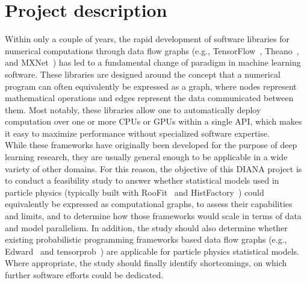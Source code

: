 \section{Project description}

Within only a couple of years, the rapid development of software libraries for numerical computations through data flow graphs (e.g., TensorFlow~\cite{tensorflow2015-whitepaper}, Theano~\cite{theano-full}, and MXNet~\cite{DBLP:journals/corr/ChenLLLWWXXZZ15}) has led to a fundamental change of paradigm in machine learning software.
These libraries are designed around the concept that a numerical program can often equivalently be expressed as a graph, where nodes represent mathematical operations and edges represent the data communicated between them.
Most notably, these libraries allow one to automatically deploy computation over one or more CPUs or GPUs within a single API, which makes it easy to maximize performance without specialized software expertise.\\

While these frameworks have originally been developed for the purpose of deep learning research, they are usually general enough to be applicable in a wide variety of other domains.
For this reason, the objective of this DIANA project is to conduct a feasibility study to answer whether statistical models used in particle physics (typically built with RooFit~\cite{Verkerke:2003ir} and HistFactory~\cite{Cranmer:2012sba}) could equivalently be expressed as computational graphs, to assess their capabilities and limits, and to determine how those frameworks would scale in terms of data and model parallelism.
In addition, the study should also determine whether existing probabilistic programming frameworks based data flow graphs (e.g., Edward~\cite{tran2016edward} and tensorprob~\cite{tensorprob2016}) are applicable for particle physics statistical models.
Where appropriate, the study should finally identify shortcomings, on which further software efforts could be dedicated.

